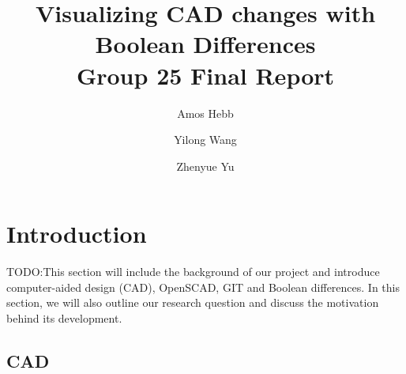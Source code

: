 \documentclass[sigconf,authorversion,nonacm]{acmart}
\begin{document}
\title[Visualizing CAD changes with Boolean Differences]
{Visualizing CAD changes with Boolean Differences\\
	\normalsize{Group 25 Final Report}}

\author{Amos Hebb}
\author{Yilong Wang}
\author{Zhenyue Yu}

\makeatletter
\def\@ACM@checkaffil{%
	\if@ACM@instpresent\else
		\ClassWarningNoLine{\@classname}{No institution present for an affiliation}%
	\fi
	\if@ACM@citypresent\else
		\ClassWarningNoLine{\@classname}{No city present for an affiliation}%
	\fi
	\if@ACM@countrypresent\else
		\ClassWarningNoLine{\@classname}{No country present for an affiliation}%
	\fi
}
\makeatother

\maketitle

\section{Introduction}

TODO:This section will include the background of our project and introduce computer-aided design (CAD), OpenSCAD, GIT and Boolean differences. In this section, we will also outline our research question and discuss the motivation behind its development.

\subsection{CAD}
\end{document}
